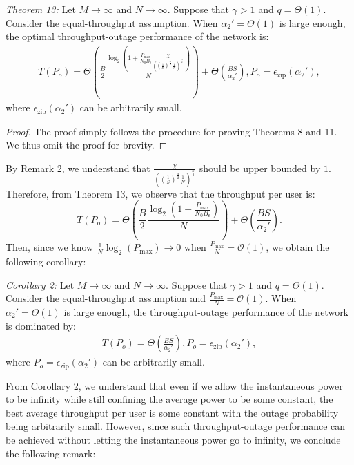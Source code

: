 \documentclass[journal,draftclsnofoot,onecolumn,12pt,twoside]{IEEEtran}
\begin{document}
{\em Theorem 13:} Let $M\to\infty$ and $N\to\infty$. Suppose that $\gamma>1$ and $q=\Theta(1)$. Consider the equal-throughput assumption. When $\alpha_2'=\Theta(1)$ is large enough, the optimal throughput-outage performance of the network is:
\begin{equation}
\begin{aligned}
T(P_o)=\Theta\left(\frac{B}{2}\frac{\log_2\left(1+\frac{P_{\text{max}}}{N_0B_{\text{s}}}\frac{\chi}{\left(\left(\frac{1}{S}\right)^{\frac{\alpha}{2}}\frac{1}{N}\right)^\frac{\alpha}{2}}\right)}{N}\right)+\Theta\left(\frac{BS}{\alpha_2'}\right),P_o=\epsilon_{\text{zip}}(\alpha_2'),
\end{aligned}
\end{equation}
where $\epsilon_{\text{zip}}(\alpha_2')$ can be arbitrarily small. 
\begin{proof}
The proof simply follows the procedure for proving Theorems 8 and 11. We thus omit the proof for brevity.
\end{proof}

By Remark 2, we understand that $\frac{\chi}{\left(\left(\frac{1}{S}\right)^{\frac{\alpha}{2}}\frac{1}{N}\right)^\frac{\alpha}{2}}$ should be upper bounded by $1$. Therefore, from Theorem 13, we observe that the throughput per user is:
\begin{equation}
T(P_o)=\Theta\left(\frac{B}{2}\frac{\log_2\left(1+\frac{P_{\text{max}}}{N_0B_{\text{s}}}\right)}{N}\right)+\Theta\left(\frac{BS}{\alpha_2'}\right).
\end{equation}
Then, since we know $\frac{1}{N}\log_2\left(P_{\text{max}}\right)\to 0$ when $\frac{P_{\text{max}}}{N}=\mathcal{O}(1)$, we obtain the following corollary:

{\em Corollary 2:} Let $M\to\infty$ and $N\to\infty$. Suppose that $\gamma>1$ and $q=\Theta(1)$. Consider the equal-throughput assumption and $\frac{P_{\text{max}}}{N}=\mathcal{O}(1)$. When $\alpha_2'=\Theta(1)$ is large enough, the throughput-outage performance of the network is dominated by:
\begin{equation}
\begin{aligned}
T(P_o)=\Theta\left(\frac{BS}{\alpha_2'}\right),P_o=\epsilon_{\text{zip}}(\alpha_2'),
\end{aligned}
\end{equation}
where $P_o=\epsilon_{\text{zip}}(\alpha_2')$ can be arbitrarily small. 

From Corollary 2, we understand that even if we allow the instantaneous power to be infinity while still confining the average power to be some constant, the best average throughput per user is some constant with the outage probability being arbitrarily small. However, since such throughput-outage performance can be achieved without letting the instantaneous power go to infinity, we conclude the following remark:
\end{document}

